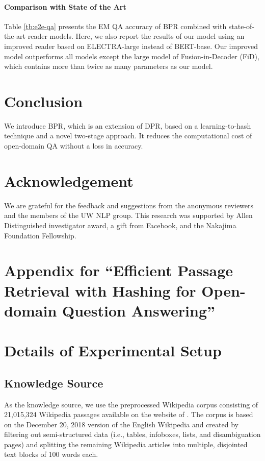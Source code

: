 \documentclass[11pt,a4paper]{article}
\begin{document}
\paragraph{Comparison with State of the Art}
\label{subsec:e2e-qa}
Table \ref{tb:e2e-qa} presents the EM QA accuracy of BPR combined with state-of-the-art reader models.
Here, we also report the results of our model using an improved reader based on ELECTRA-large \cite{Clark2020ELECTRA:Generators} instead of BERT-base.
Our improved model outperforms all models except the large model of Fusion-in-Decoder (FiD), which contains more than twice as many parameters as our model.

\section{Conclusion}
We introduce BPR, which is an extension of DPR, based on a learning-to-hash technique and a novel two-stage approach.
It reduces the computational cost of open-domain QA without a loss in accuracy.

\section*{Acknowledgement}
We are grateful for the feedback and suggestions from the anonymous reviewers and the members of the UW NLP group. This research was supported by Allen Distinguished investigator award, a gift from Facebook, and the Nakajima Foundation Fellowship.




\appendix
\clearpage

\section*{Appendix for ``Efficient Passage Retrieval with Hashing for Open-domain Question Answering''}

\section{Details of Experimental Setup}
\label{sec:detail-experimental-setup}

\subsection{Knowledge Source}
As the knowledge source,  we use the preprocessed Wikipedia corpus consisting of 21,015,324 Wikipedia passages available on the website of \citet{Karpukhin2020DenseAnswering}.
The corpus is based on the December 20, 2018 version of the English Wikipedia and created by filtering out semi-structured data (i.e., tables, infoboxes, lists, and disambiguation pages) and splitting the remaining Wikipedia articles into multiple, disjointed text blocks of 100 words each.
\end{document}
